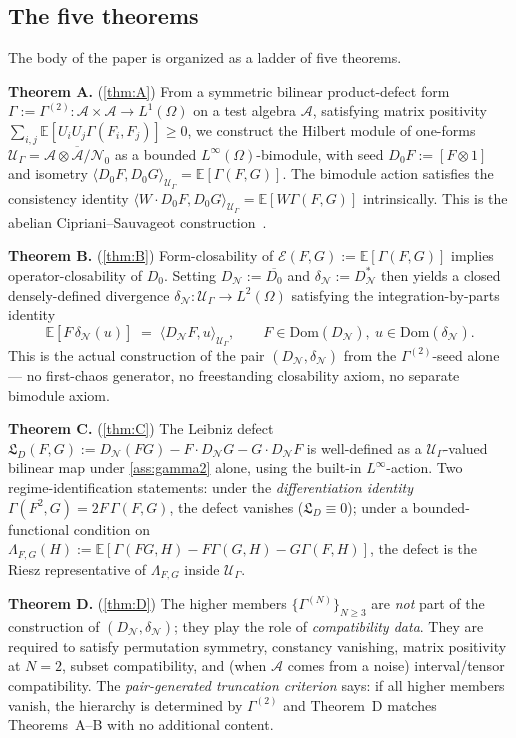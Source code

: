 \documentclass[11pt,reqno]{amsart}
\theoremstyle{plain}
\theoremstyle{definition}
\theoremstyle{remark}
\newcommand{\E}{\mathbb{E}}
\newcommand{\Dom}{\mathrm{Dom}}
\newcommand{\cA}{\mathcal A}
\newcommand{\cE}{\mathcal E}
\newcommand{\cN}{\mathcal N}
\newcommand{\cU}{\mathcal U}
\newcommand{\dN}{D_{\cN}}
\newcommand{\divN}{\delta_{\cN}}
\newcommand{\Lleib}{\mathfrak L}
\begin{document}
\subsection{The five theorems}\label{sec:intro-theorems}

The body of the paper is organized as a ladder of five theorems.

\textbf{Theorem A.} (\cref{thm:A}) From a symmetric bilinear
product-defect form $\Gamma:=\Gamma^{(2)}\colon\cA\times\cA\to
L^{1}(\Omega)$ on a test algebra $\cA$, satisfying matrix
positivity
$\sum_{i,j}\E[U_{i}U_{j}\Gamma(F_{i},F_{j})]\ge 0$, we
construct the Hilbert module of one-forms
$\cU_{\Gamma}=\overline{\cA\otimes\cA/\mathcal N_{0}}$ as a
bounded $L^{\infty}(\Omega)$-bimodule, with seed
$D_{0}F:=[F\otimes 1]$ and isometry
$\langle D_{0}F,D_{0}G\rangle_{\cU_{\Gamma}}=\E[\Gamma(F,G)]$.
The bimodule action satisfies the consistency identity
$\langle W\cdot D_{0}F,D_{0}G\rangle_{\cU_{\Gamma}}=\E[W\Gamma(F,G)]$
intrinsically. This is the abelian Cipriani--Sauvageot
construction~\cite{CiprianiSauvageot}.

\textbf{Theorem B.} (\cref{thm:B}) Form-closability of
$\cE(F,G):=\E[\Gamma(F,G)]$ implies operator-closability of
$D_{0}$. Setting $\dN:=\overline{D_{0}}$ and
$\divN:=\dN^{*}$ then yields a closed densely-defined divergence
$\divN\colon\cU_{\Gamma}\to L^{2}(\Omega)$ satisfying the
integration-by-parts identity
\[
  \E[F\,\divN(u)]\;=\;\langle\dN F,u\rangle_{\cU_{\Gamma}},
  \qquad F\in\Dom(\dN),\ u\in\Dom(\divN).
\]
This is the actual construction of the pair $(\dN,\divN)$ from
the $\Gamma^{(2)}$-seed alone --- no first-chaos generator, no
freestanding closability axiom, no separate bimodule axiom.

\textbf{Theorem C.} (\cref{thm:C}) The Leibniz defect
$\Lleib_{D}(F,G):=\dN(FG)-F\cdot\dN G-G\cdot\dN F$ is
well-defined as a $\cU_{\Gamma}$-valued bilinear map under
\cref{ass:gamma2} alone, using the built-in $L^{\infty}$-action.
Two regime-identification statements: under the
\emph{differentiation identity}
$\Gamma(F^{2},G)=2F\,\Gamma(F,G)$, the defect vanishes
($\Lleib_{D}\equiv 0$); under a bounded-functional condition on
$\Lambda_{F,G}(H):=\E[\Gamma(FG,H)-F\Gamma(G,H)-G\Gamma(F,H)]$,
the defect is the Riesz representative of $\Lambda_{F,G}$ inside
$\cU_{\Gamma}$.

\textbf{Theorem D.} (\cref{thm:D}) The higher members
$\{\Gamma^{(N)}\}_{N\ge 3}$ are \emph{not} part of the
construction of $(\dN,\divN)$; they play the role of
\emph{compatibility data}. They are required to satisfy
permutation symmetry, constancy vanishing, matrix positivity at
$N=2$, subset compatibility, and (when $\cA$ comes from a noise)
interval/tensor compatibility. The \emph{pair-generated
truncation criterion} says: if all higher members vanish, the
hierarchy is determined by $\Gamma^{(2)}$ and Theorem~D
matches Theorems~A--B with no additional content.
\end{document}

